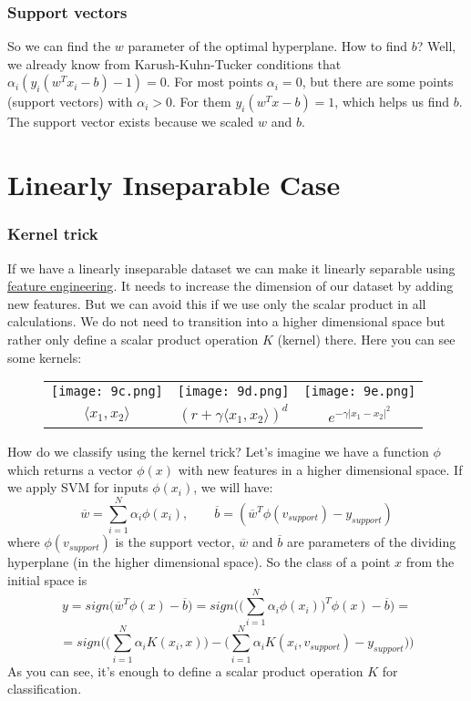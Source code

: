 \subsubsection*{Support vectors}

So we can find the $w$ parameter of the optimal hyperplane. How to find $b$? Well, we already know from Karush-Kuhn-Tucker conditions that $\alpha_i(y_i(w^Tx_i-b)-1)=0$. For most points $\alpha_i=0$, but there are some points (support vectors) with $\alpha_i>0$. For them $y_i(w^Tx-b)=1$, which helps us find $b$. The support vector exists because we scaled $w$ and $b$.

\pagebreak
\section{Linearly Inseparable Case}
\vspace{-0.6cm}
\subsubsection*{Kernel trick}

If we have a linearly inseparable dataset we can make it linearly separable using \hyperlink{new_features}{feature engineering}. It needs to increase the dimension of our dataset by adding new features. But we can avoid this if we use only the scalar product in all calculations. We do not need to transition into a higher dimensional space but rather only
define a scalar product operation $K$ (kernel) there. Here you can see some kernels:\\
\begin{figure}[h]
  \centering
  \begin{tabular}{ccc}
    \texttt{[image: 9c.png]} & \hspace{0.5cm}
    \texttt{[image: 9d.png]} & \hspace{0.5cm}
    \texttt{[image: 9e.png]} \\
    $\langle x_1,x_2\rangle$ & $(r+\gamma\langle x_1,x_2\rangle)^d$ & $e^{-\gamma|x_1-x_2|^2}$ \\
  \end{tabular}
\end{figure}
How do we classify using the kernel trick? Let's imagine we have a function $\phi$ which returns a vector $\phi(x)$ with new features in a higher dimensional space. If we apply SVM for inputs $\phi(x_i)$, we will have:
$$\overline{w}=\sum\limits_{i=1}^{N}\alpha_i\phi(x_i),\qquad\overline{b}=(\overline{w}^T\phi(v_{support})-y_{support})$$
where $\phi(v_{support})$ is the support vector, $\overline{w}$ and $\overline{b}$ are parameters of the dividing hyperplane (in the higher dimensional space). So the class of a point $x$ from the initial space is
$$y=sign\big(\overline{w}^T\phi(x)-\overline{b}\big)=sign\big(\Big(\sum\limits_{i=1}^{N}\alpha_i \phi(x_i)\Big)^T\phi(x)-\overline{b}\big)=$$
$$=sign\big(\Big(\sum\limits_{i=1}^{N}\alpha_iK(x_i,x)\Big)-\Big(\sum\limits_{i=1}^{N}\alpha_iK(x_i,v_{support})-y_{support}\Big)\big)$$
As you can see, it's enough to define a scalar product operation $K$ for classification.

